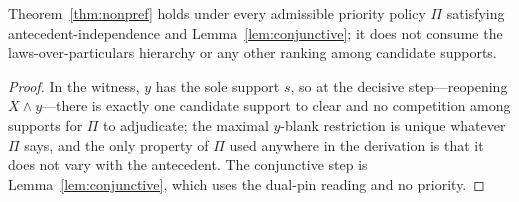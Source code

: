 \begin{lemma}\label{lem:priority}
Theorem~\ref{thm:nonpref} holds under every admissible priority policy $\Pi$ satisfying antecedent-independence and Lemma~\ref{lem:conjunctive}; it does not consume the laws-over-particulars hierarchy or any other ranking among candidate supports.
\end{lemma}
\begin{proof}
In the witness, $y$ has the sole support $s$, so at the decisive step---reopening $X \wedge y$---there is exactly one candidate support to clear and no competition among supports for $\Pi$ to adjudicate; the maximal $y$-blank restriction is unique whatever $\Pi$ says, and the only property of $\Pi$ used anywhere in the derivation is that it does not vary with the antecedent. The conjunctive step is Lemma~\ref{lem:conjunctive}, which uses the dual-pin reading and no priority.
\end{proof}

